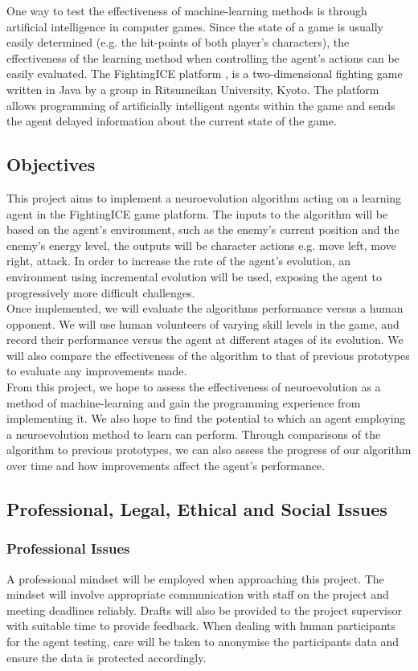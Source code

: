 \documentclass[11pt,a4paper]{article}
\begin{document}
One way to test the effectiveness of machine-learning methods is through artificial intelligence in computer games. Since the state of a game is usually easily determined (e.g. the hit-points of both player's characters), the effectiveness of the learning method when controlling the agent's actions can be easily evaluated. The FightingICE platform \cite{fightingice}, is a two-dimensional fighting game written in Java by a group in Ritsumeikan University, Kyoto. The platform allows programming of artificially intelligent agents within the game and sends the agent delayed information about the current state of the game. 
\newpage
\subsection{Objectives}
This project aims to implement a neuroevolution algorithm acting on a learning agent in the FightingICE game platform. The inputs to the algorithm will be based on the agent's environment, such as the enemy's current position and the enemy's energy level, the outputs will be character actions e.g. move left, move right, attack. In order to increase the rate of the agent's evolution, an environment using incremental evolution will be used, exposing the agent to progressively more difficult challenges.\\

Once implemented, we will evaluate the algorithms performance versus a human opponent. We will use human volunteers of varying skill levels in the game, and record their performance versus the agent at different stages of its evolution. We will also compare the effectiveness of the algorithm to that of previous prototypes to evaluate any improvements made.\\

From this project, we hope to assess the effectiveness of neuroevolution as a method of machine-learning and gain the programming experience from implementing it. We also hope to find the potential to which an agent employing a neuroevolution method to learn can perform. Through comparisons of the algorithm to previous prototypes, we can also assess the progress of our algorithm over time and how improvements affect the agent's performance.
\newpage
\subsection{Professional, Legal, Ethical and Social Issues}
\subsubsection{Professional Issues}
A professional mindset will be employed when approaching this project. The mindset will involve appropriate communication with staff on the project and meeting deadlines reliably. Drafts will also be provided to the project supervisor with suitable time to provide feedback. When dealing with human participants for the agent testing, care will be taken to anonymise the participants data and ensure the data is protected accordingly.
\end{document}

